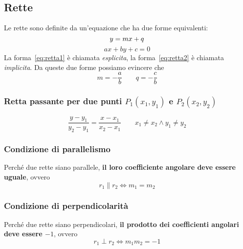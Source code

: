 \subsection{Rette}\label{subsec:geomanal:retta}
\begin{center}
\end{center}
Le rette sono definite da un'equazione che ha due forme equivalenti:
\begin{equation}\label{eq:retta1}
  y = mx + q\\
\end{equation}
\begin{equation}\label{eq:retta2}
  ax + by + c = 0
\end{equation}
La forma~\eqref{eq:retta1} è chiamata \emph{esplicita}, la forma~\eqref{eq:retta2} è chiamata 
\emph{implicita}. Da queste due forme possiamo evincere che
\begin{equation*}
  m = -\frac{a}{b} \qquad q = -\frac{c}{b}
\end{equation*}
\setcounter{equation}{0}

\subsubsection{Retta passante per due punti $P_1(x_1,y_1)$ e $P_2(x_2,y_2)$}
\begin{equation*}
  \frac{y-y_1}{y_2-y_1}=\frac{x-x_1}{x_2-x_1} \qquad x_1\neq x_2 \land y_1\neq y_2
\end{equation*}

\subsubsection{Condizione di parallelismo}
Perché due rette siano parallele, \textbf{il loro coefficiente angolare deve essere uguale}, ovvero
\begin{equation*}
  r_1 \| r_2 \iff m_1=m_2
\end{equation*}

\subsubsection{Condizione di perpendicolarità}
Perché due rette siano perpendicolari, \textbf{il prodotto dei coefficienti angolari deve essere $-1$},
ovvero
\begin{equation*}
  r_1 \perp r_2 \iff m_1m_2 = -1
\end{equation*}

